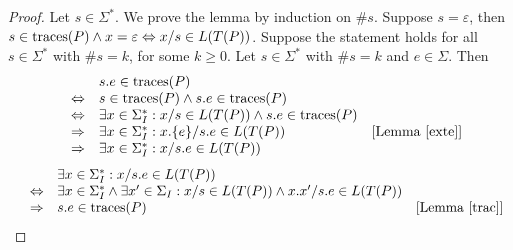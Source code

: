 \begin{proof}
Let $s\in \Sigma^*$. We prove the lemma by induction on $\#s$. Suppose
$s=\varepsilon $, then $s\in \text{traces}(P)\wedge x=\varepsilon \Leftrightarrow
x/s\in L(T(P))$. Suppose the statement holds for all $s\in \Sigma^*$ with
$\#s=k$, for some $k\ge 0$. Let $s\in \Sigma^*$ with $\#s=k$ and
$e\in\Sigma$. Then \[\begin{array}{llll}
&& s.e\in \text{traces}(P)\\
&\Leftrightarrow & s\in \text{traces}(P)\wedge s.e\in \text{traces}(P)\\
&\Leftrightarrow &  \exists x\in \Sigma_I^*: x/s\in L(T(P))\wedge s.e\in \text{traces}(P)\\
&\Rightarrow & \exists x\in \Sigma_I^*: x.\{e\}/s.e\in L(T(P))&[{\text{Lemma~\ref{exte}}}]\\
&\Rightarrow & \exists x\in \Sigma_I^*: x/s.e\in L(T(P))
\end{array}
\]
 \[\begin{array}{llll}
&& \exists x\in \Sigma_I^*: x/s.e\in L(T(P))\\
&\Leftrightarrow & \exists x\in \Sigma_I^*\wedge \exists x'\in \Sigma_I: x/s\in L(T(P))\wedge x.x'/s.e\in L(T(P))\\
&\Rightarrow & s.e\in \text{traces}(P)&[{\text{Lemma~\ref{trac}}}]\\
\end{array}
\]
\end{proof}

